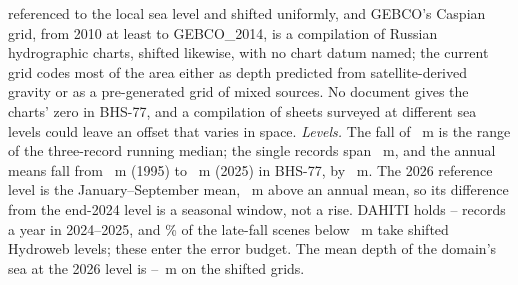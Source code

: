 referenced to the local sea level and shifted uniformly\citep{amante2009}, and GEBCO's Caspian grid, from 2010 at least to GEBCO\_2014, is a compilation of Russian hydrographic charts, shifted likewise, with no chart datum named\citep{gebco2014_doc}; the current grid codes most of the area either as depth predicted from satellite-derived gravity or as a pre-generated grid of mixed sources\citep{gebco2026}. No document gives the charts' zero in BHS-77, and a compilation of sheets surveyed at different sea levels could leave an offset that varies in space. \emph{Levels.} The fall of ~m is the range of the three-record running median; the single records span ~m, and the annual means fall from ~m (1995) to ~m (2025) in BHS-77, by ~m. The 2026 reference level is the January--September mean, ~m above an annual mean, so its difference from the end-2024 level is a seasonal window, not a rise. DAHITI holds -- records a year in 2024--2025, and \% of the late-fall scenes below ~m take shifted Hydroweb levels; these enter the error budget. The mean depth of the domain's sea at the 2026 level is --~m on the shifted grids.

